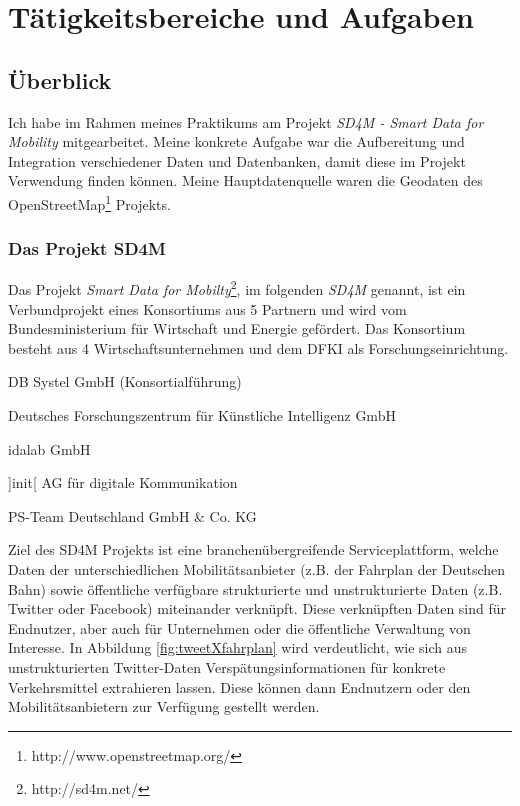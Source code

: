 \chapter{Tätigkeitsbereiche und Aufgaben}
\label{sec:main}
\section{Überblick}
\label{sec:main:overview}
Ich habe im Rahmen meines Praktikums am Projekt \textit{SD4M - Smart Data for Mobility} mitgearbeitet.
Meine konkrete Aufgabe war die Aufbereitung und Integration verschiedener Daten und Datenbanken, damit diese im Projekt Verwendung finden können. Meine Hauptdatenquelle waren die Geodaten des OpenStreetMap\footnote{http://www.openstreetmap.org/} Projekts.
\subsection{Das Projekt SD4M}
\label{sec:main:overview:sd4m}
Das Projekt \textit{Smart Data for Mobilty}\footnote{http://sd4m.net/}, im folgenden \textit{SD4M} genannt, ist ein Verbundprojekt eines Konsortiums aus 5 Partnern und wird vom Bundesministerium für Wirtschaft und Energie gefördert.
Das Konsortium besteht aus 4 Wirtschaftsunternehmen und dem DFKI als Forschungseinrichtung.
\begin{compactitem}
  \item DB Systel GmbH (Konsortialführung)
  \item Deutsches Forschungszentrum für Künstliche Intelligenz GmbH
  \item idalab GmbH
  \item ]init[ AG für digitale Kommunikation
  \item PS-Team Deutschland GmbH & Co. KG
\end{compactitem}
Ziel des SD4M Projekts ist eine branchenübergreifende Serviceplattform, welche Daten der unterschiedlichen Mobilitätsanbieter (z.B. der Fahrplan der Deutschen Bahn) sowie öffentliche verfügbare strukturierte und unstrukturierte Daten (z.B. Twitter oder Facebook) miteinander verknüpft.
Diese verknüpften Daten sind für Endnutzer, aber auch für Unternehmen oder die öffentliche Verwaltung von Interesse.
In Abbildung \ref{fig:tweetXfahrplan} wird verdeutlicht, wie sich aus unstrukturierten Twitter-Daten Verspätungsinformationen für konkrete Verkehrsmittel extrahieren lassen.
Diese können dann Endnutzern oder den Mobilitätsanbietern zur Verfügung gestellt werden.

